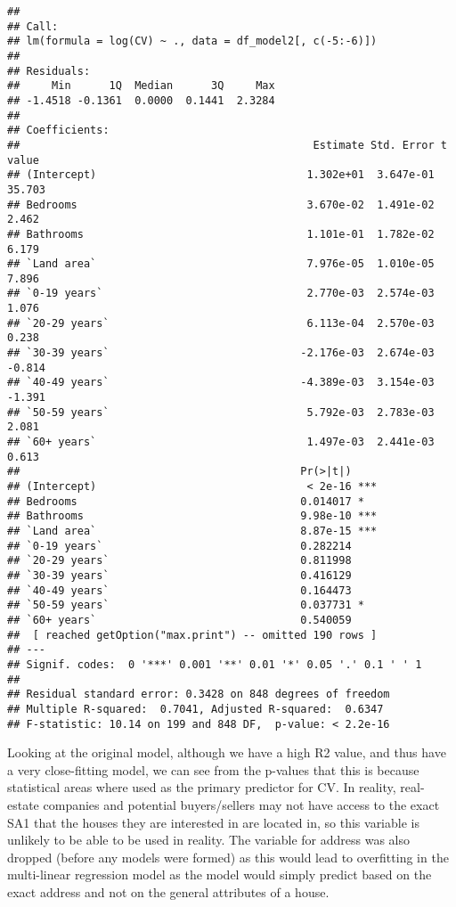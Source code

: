 \documentclass[
]{article}
\begin{document}
\begin{verbatim}
## 
## Call:
## lm(formula = log(CV) ~ ., data = df_model2[, c(-5:-6)])
## 
## Residuals:
##     Min      1Q  Median      3Q     Max 
## -1.4518 -0.1361  0.0000  0.1441  2.3284 
## 
## Coefficients:
##                                              Estimate Std. Error t value
## (Intercept)                                 1.302e+01  3.647e-01  35.703
## Bedrooms                                    3.670e-02  1.491e-02   2.462
## Bathrooms                                   1.101e-01  1.782e-02   6.179
## `Land area`                                 7.976e-05  1.010e-05   7.896
## `0-19 years`                                2.770e-03  2.574e-03   1.076
## `20-29 years`                               6.113e-04  2.570e-03   0.238
## `30-39 years`                              -2.176e-03  2.674e-03  -0.814
## `40-49 years`                              -4.389e-03  3.154e-03  -1.391
## `50-59 years`                               5.792e-03  2.783e-03   2.081
## `60+ years`                                 1.497e-03  2.441e-03   0.613
##                                            Pr(>|t|)    
## (Intercept)                                 < 2e-16 ***
## Bedrooms                                   0.014017 *  
## Bathrooms                                  9.98e-10 ***
## `Land area`                                8.87e-15 ***
## `0-19 years`                               0.282214    
## `20-29 years`                              0.811998    
## `30-39 years`                              0.416129    
## `40-49 years`                              0.164473    
## `50-59 years`                              0.037731 *  
## `60+ years`                                0.540059    
##  [ reached getOption("max.print") -- omitted 190 rows ]
## ---
## Signif. codes:  0 '***' 0.001 '**' 0.01 '*' 0.05 '.' 0.1 ' ' 1
## 
## Residual standard error: 0.3428 on 848 degrees of freedom
## Multiple R-squared:  0.7041, Adjusted R-squared:  0.6347 
## F-statistic: 10.14 on 199 and 848 DF,  p-value: < 2.2e-16
\end{verbatim}

Looking at the original model, although we have a high R2 value, and
thus have a very close-fitting model, we can see from the p-values that
this is because statistical areas where used as the primary predictor
for CV. In reality, real-estate companies and potential buyers/sellers
may not have access to the exact SA1 that the houses they are interested
in are located in, so this variable is unlikely to be able to be used in
reality. The variable for address was also dropped (before any models
were formed) as this would lead to overfitting in the multi-linear
regression model as the model would simply predict based on the exact
address and not on the general attributes of a house.
\end{document}
